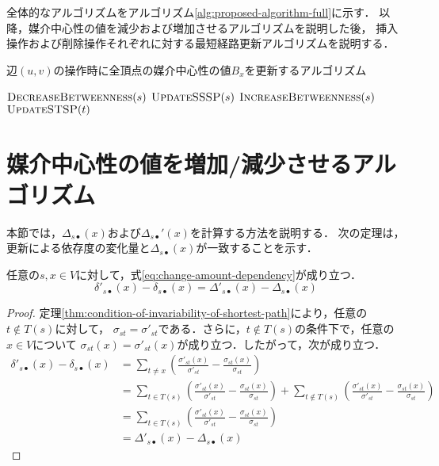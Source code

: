 全体的なアルゴリズムをアルゴリズム\ref{alg:proposed-algorithm-full}に示す．
以降，媒介中心性の値を減少および増加させるアルゴリズムを説明した後，
挿入操作および削除操作それぞれに対する最短経路更新アルゴリズムを説明する．

\begin{algorithm}[tb]
  \caption{辺$(u,v)$の操作時に全頂点の媒介中心性の値$B_x$を更新するアルゴリズム}
  \label{alg:proposed-algorithm-full}
  \begin{algorithmic}[1]\small
    \State $\textproc{DecreaseBetweenness}(s)$
    \State $\textproc{UpdateSSSP}(s)$
    \State $\textproc{IncreaseBetweenness}(s)$
    \EndFor
    \State $\textproc{UpdateSTSP}(t)$
    \EndFor
    \EndProcedure
  \end{algorithmic}
\end{algorithm}

\section{媒介中心性の値を増加/減少させるアルゴリズム}
\label{sect:update-betweenness}

本節では，$\Delta_{s\bullet}(x)$および$\Delta_{s\bullet}'(x)$を計算する方法を説明する．
次の定理は，更新による依存度の変化量と$\Delta_{s\bullet}(x)$が一致することを示す．
\begin{theorem}
  任意の$s,x\in V$に対して，式\eqref{eq:change-amount-dependency}が成り立つ．
  \begin{equation}
    \delta'_{s\bullet}(x)-\delta_{s\bullet}(x)=\Delta'_{s\bullet}(x)-\Delta_{s\bullet}(x)
    \label{eq:change-amount-dependency}
  \end{equation}
\end{theorem}
\begin{proof}
  定理\ref{thm:condition-of-invariability-of-shortest-path}により，任意の$t\notin T(s)$に対して，
  $\sigma_{st}=\sigma'_{st}$である．さらに，$t\notin T(s)$の条件下で，任意の$x\in V$について
  $\sigma_{st}(x)=\sigma'_{st}(x)$が成り立つ．したがって，次が成り立つ．
  \begin{equation*}
    \begin{aligned}
      \delta'_{s\bullet}(x)-\delta_{s\bullet}(x)
      &=\sum_{t\neq x}\left(\frac{\sigma'_{st}(x)}{\sigma'_{st}}-\frac{\sigma_{st}(x)}{\sigma_{st}}\right) \\
      &=\sum_{t\in T(s)}\left(\frac{\sigma'_{st}(x)}{\sigma'_{st}}-\frac{\sigma_{st}(x)}{\sigma_{st}}\right)
      +\sum_{t\notin T(s)}\left(\frac{\sigma'_{st}(x)}{\sigma'_{st}}-\frac{\sigma_{st}(x)}{\sigma_{st}}\right) \\
      &=\sum_{t\in T(s)}\left(\frac{\sigma'_{st}(x)}{\sigma'_{st}}-\frac{\sigma_{st}(x)}{\sigma_{st}}\right) \\
      &=\Delta'_{s\bullet}(x)-\Delta_{s\bullet}(x)
    \end{aligned}
  \end{equation*}
\end{proof}

